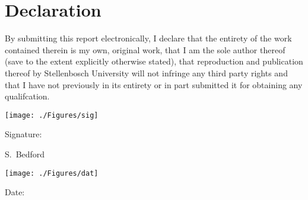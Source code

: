 \chapter{Declaration}

By submitting this report electronically, I declare that the entirety of the work contained
therein is my own, original work, that I am the sole author thereof (save to the extent
explicitly otherwise stated), that reproduction and publication thereof by Stellenbosch
University will not infringe any third party rights and that I have not previously in its
entirety or in part submitted it for obtaining any qualifcation.

\vspace{3cm}
\hspace{1.5cm}
\vspace{-.8cm}
\texttt{[image: ./Figures/sig]}\\
\noindent%
\parbox{.5\textwidth}{%
  Signature:\quad\dotfill\par
  \hfill S.\ Bedford\hspace{1.2cm}\null}


\vspace{1.5cm}
\hspace{1.5cm}
\vspace{-.8cm}
\texttt{[image: ./Figures/dat]}\\
\noindent%
\parbox{.5\textwidth}{%
  Date:\quad\dotfill\par}
